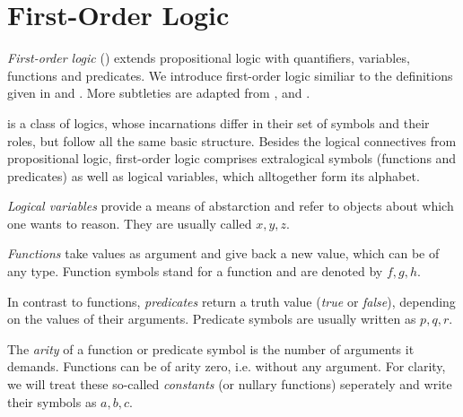



    \section{First-Order Logic}
        \label{sec:first-order-logic}

        \emph{First-order logic} (\FOL) extends propositional logic with quantifiers, variables, functions and predicates.
        We introduce first-order logic similiar to the definitions given in \cite{Platzer10HybridSystems} and \cite{Huth04LogicInCS}. More subtleties are adapted from \cite{Hodges01ClassicalLogic}, \cite{Buss98HandbookProofTheory} and \cite{Rautenberg10ConciseLogic}.

        \FOL is a class of logics, whose incarnations differ in their set of symbols and their roles, but follow all the same basic structure.
        Besides the logical connectives from propositional logic, first-order logic comprises extralogical symbols (functions and predicates) as well as logical variables, which alltogether form its alphabet.

        \emph{Logical variables} provide a means of abstarction and refer to objects about which one wants to reason. They are usually called $x,y,z$. 

        \emph{Functions} take values as argument and give back a new value, which can be of any type. Function symbols stand for a function and are denoted by $f,g,h$.

        In contrast to functions, \emph{predicates} return a truth value (\emph{true} or \emph{false}), depending on the values of their arguments.
        Predicate symbols are usually written as $p,q,r$.

        The \emph{arity} of a function or predicate symbol is the number of arguments it demands.
        Functions can be of arity zero, i.e. without any argument.
        For clarity, we will treat these so-called \emph{constants} (or nullary functions) seperately and write their symbols as $a,b,c$.


